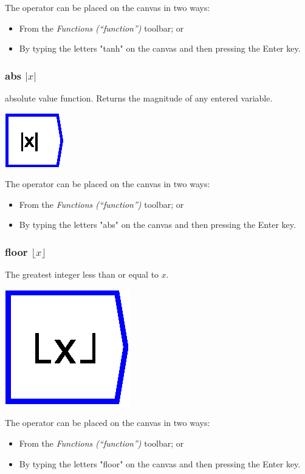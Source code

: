 The operator can be placed on the canvas in two ways:
\begin{itemize}
\item From the \emph{Functions (``function'')} toolbar; or 
\item By typing the letters "tanh" on the canvas and then pressing the
Enter key.
\end{itemize}

\subsubsection{abs $|x|$}

\label{Operation:abs} absolute value function. Returns the magnitude
of any entered variable.

\includegraphics{images/abs}

The operator can be placed on the canvas in two ways:
\begin{itemize}
\item From the \emph{Functions (``function'')} toolbar; or 
\item By typing the letters "abs" on the canvas and then pressing the
Enter key.
\end{itemize}

\subsubsection{floor $\lfloor x\rfloor$}

\label{Operation:floor} The greatest integer less than or equal to
$x$. 

\includegraphics{images/floor}

The operator can be placed on the canvas in two ways:
\begin{itemize}
\item From the \emph{Functions (``function'')} toolbar; or 
\item By typing the letters "floor" on the canvas and then pressing the
Enter key.
\end{itemize}

